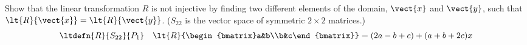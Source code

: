 Show that the linear transformation $R$ is not injective by finding two different elements of the domain, $\vect{x}$ and $\vect{y}$, such that $\lt{R}{\vect{x}}=\lt{R}{\vect{y}}$.  ($S_{22}$ is the vector space of symmetric $2\times 2$ matrices.) 
%
\begin{equation*}
\ltdefn{R}{S_{22}}{P_1}\quad 
\lt{R}{\begin{bmatrix}a&b\\b&c\end{bmatrix}}=(2a-b+c)+(a+b+2c)x
\end{equation*}
